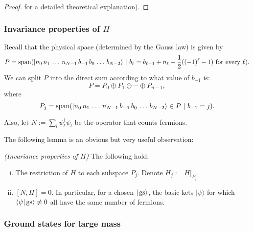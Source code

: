 \begin{proof}
{} for a detailed theoretical explanation).
\end{proof}
\subsubsection{Invariance properties of $H$}
Recall that the physical space (determined by the Gauss law) is given by
	\[
	P = \operatorname{span} ( |n_0\, n_1\, \ldots \, n_{N-1} \, b_{-1}\, b_0\, \ldots\, b_{N-2}\rangle \ | \ b_{\ell} =b_{\ell-1} + n_{\ell} + \frac{1}{2}((-1)^\ell-1) \ \text{for every} \ \ell).
	\]
	We can split $P$ into the direct sum according to what value of $b_{-1}$ is:
	\[
	P = P_0 \oplus P_1 \oplus \cdots \oplus P_{n-1},
	\]
	where
	\[
	P_j = \operatorname{span}( |n_0\, n_1\, \ldots \, n_{N-1} \, b_{-1}\, b_0\, \ldots\, b_{N-2}\rangle \in P \ | \ b_{-1} = j).
	\]

Also, let $N:= \sum_{l} \psi_l^\dagger \psi_l$ be the operator that counts fermions.

The following lemma is an obvious but very useful observation:

\begin{lemma}\emph{(Invariance properties of $H$)} The following hold:
\begin{enumerate}[(i)]
\item The restriction of $H$ to each subspace $P_j$. Denote $H_j := H|_{P_j}$.
\item $[N,H] = 0$. In particular, for a chosen $|\operatorname{gs}\rangle$, the basic kets $|\psi\rangle$ for which $\langle \psi | \operatorname{gs} \rangle \neq 0$ all have the same number of fermions.
\end{enumerate}
\end{lemma}

\subsubsection{Ground states for large mass}

